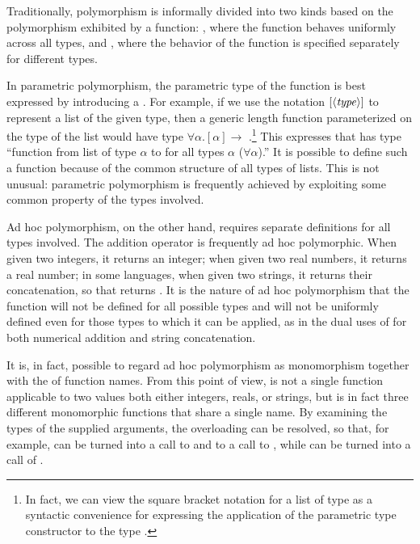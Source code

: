 Traditionally, polymorphism is informally divided into two kinds based on the polymorphism exhibited by a function: , where the function behaves uniformly across all types, and , where the behavior of the function is specified separately for different types.

In parametric polymorphism, the parametric type of the function is best expressed by introducing a . For example, if we use the notation $[\langle \text{\textit{type}} \rangle]$ to represent a list of the given type, then a generic length function parameterized on the type of the list would have type $\forall \alpha. [\alpha] \to$ .\footnote{In fact, we can view the square bracket notation \code{[T]} for a list of type  as a syntactic convenience for expressing the application of the parametric type constructor  to the type .} This expresses that  has type ``function from list of type $\alpha$ to  for all types $\alpha$ ($\forall \alpha$).'' It is possible to define such a function because of the common structure of all types of lists. This is not unusual: parametric polymorphism is frequently achieved by exploiting some common property of the types involved.

Ad hoc polymorphism, on the other hand, requires separate definitions for all types involved. The addition operator \code{+} is frequently ad hoc polymorphic. When given two integers, it returns an integer; when given two real numbers, it returns a real number; in some languages, when given two strings, it returns their concatenation, so that  returns . It is the nature of ad hoc polymorphism that the function will not be defined for all possible types and will not be uniformly defined even for those types to which it can be applied, as in the dual uses of \code{+} for both numerical addition and string concatenation.

It is, in fact, possible to regard ad hoc polymorphism as monomorphism together with the  of function names. From this point of view, \code{+} is not a single function applicable to two values both either integers, reals, or strings, but is in fact three different monomorphic functions that share a single name. By examining the types of the supplied arguments, the overloading can be resolved, so that, for example,  can be turned into a call to  and  to a call to , while  can be turned into a call of .

